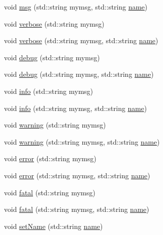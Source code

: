 \begin{DoxyCompactItemize}
\item 
void \hyperlink{classObject_ac5d59299273cee27aacf7de00d2e7034}{msg} (std\+::string mymsg, std\+::string \hyperlink{classObject_a300f4c05dd468c7bb8b3c968868443c1}{name})
\item 
void \hyperlink{classObject_a83d2db2df682907ea1115ad721c1c4a1}{verbose} (std\+::string mymsg)
\item 
void \hyperlink{classObject_a2d4120195317e2a3c6532e8bb9f3da68}{verbose} (std\+::string mymsg, std\+::string \hyperlink{classObject_a300f4c05dd468c7bb8b3c968868443c1}{name})
\item 
void \hyperlink{classObject_aac010553f022165573714b7014a15f0d}{debug} (std\+::string mymsg)
\item 
void \hyperlink{classObject_a6c9a0397ca804e04d675ed05683f5420}{debug} (std\+::string mymsg, std\+::string \hyperlink{classObject_a300f4c05dd468c7bb8b3c968868443c1}{name})
\item 
void \hyperlink{classObject_a644fd329ea4cb85f54fa6846484b84a8}{info} (std\+::string mymsg)
\item 
void \hyperlink{classObject_a1ca123253dfd30fc28b156f521dcbdae}{info} (std\+::string mymsg, std\+::string \hyperlink{classObject_a300f4c05dd468c7bb8b3c968868443c1}{name})
\item 
void \hyperlink{classObject_a65cd4fda577711660821fd2cd5a3b4c9}{warning} (std\+::string mymsg)
\item 
void \hyperlink{classObject_a11f101db4dd73d9391b0231818881d86}{warning} (std\+::string mymsg, std\+::string \hyperlink{classObject_a300f4c05dd468c7bb8b3c968868443c1}{name})
\item 
void \hyperlink{classObject_a204a95f57818c0f811933917a30eff45}{error} (std\+::string mymsg)
\item 
void \hyperlink{classObject_ad7f6c457733082efa2f9ff5f5c8e119a}{error} (std\+::string mymsg, std\+::string \hyperlink{classObject_a300f4c05dd468c7bb8b3c968868443c1}{name})
\item 
void \hyperlink{classObject_aad5a16aac7516ce65bd5ec02ab07fc80}{fatal} (std\+::string mymsg)
\item 
void \hyperlink{classObject_ae62acd3d09f716220f75f252dc38bc9a}{fatal} (std\+::string mymsg, std\+::string \hyperlink{classObject_a300f4c05dd468c7bb8b3c968868443c1}{name})
\item 
void \hyperlink{classObject_ae30fea75683c2d149b6b6d17c09ecd0c}{set\+Name} (std\+::string \hyperlink{classObject_a300f4c05dd468c7bb8b3c968868443c1}{name})
\item 

\end{DoxyCompactItemize}
